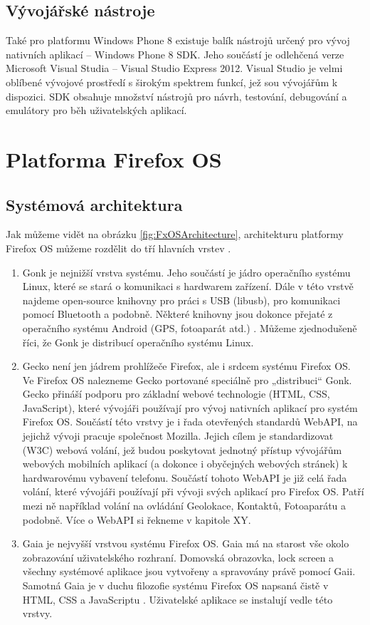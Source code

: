 \subsection{Vývojářské nástroje}
Také pro platformu Windows Phone 8 existuje balík nástrojů určený pro vývoj nativních aplikací – Windows Phone 8 SDK. Jeho součástí je odlehčená verze Microsoft Visual Studia – Visual Studio Express 2012. Visual Studio je velmi oblíbené vývojové prostředí s širokým spektrem funkcí, jež sou vývojářům k dispozici. SDK obsahuje množství nástrojů pro návrh, testování, debugování a emulátory pro běh uživatelských aplikací.

\section{Platforma Firefox OS} \label{Sec:FxOS}
\subsection{Systémová architektura}
Jak můžeme vidět na obrázku \ref{fig:FxOSArchitecture}, architekturu platformy Firefox OS můžeme rozdělit do tří hlavních vrstev \cite{fxOs_architecture}.

\begin{enumerate}
	\item Gonk je nejnižší vrstva systému. Jeho součástí je jádro operačního systému Linux, které se stará o komunikaci s hardwarem zařízení. Dále v této vrstvě najdeme open-source knihovny pro práci s USB (libusb), pro komunikaci pomocí Bluetooth a podobně. Některé knihovny jsou dokonce přejaté z operačního systému Android (GPS, fotoaparát atd.) \cite{fxOs_architecture}. Můžeme zjednodušeně říci, že Gonk je distribucí operačního systému Linux.
	\item Gecko není jen jádrem prohlížeče Firefox, ale i srdcem systému Firefox OS. Ve Firefox OS nalezneme Gecko portované speciálně pro „distribuci“ Gonk. Gecko přináší podporu pro základní webové technologie (HTML, CSS, JavaScript), které vývojáři používají pro vývoj nativních aplikací pro systém Firefox OS. Součástí této vrstvy je i řada otevřených standardů WebAPI, na jejichž vývoji pracuje společnost Mozilla. Jejich cílem je standardizovat (W3C) webová volání, jež budou poskytovat jednotný přístup vývojářům webových mobilních aplikací (a dokonce i obyčejných webových stránek) k hardwarovému vybavení telefonu. Součástí tohoto WebAPI je již celá řada volání, které vývojáři používají při vývoji svých aplikací pro Firefox OS. Patří mezi ně například volání na ovládání Geolokace, Kontaktů, Fotoaparátu a podobně. Více o WebAPI si řekneme v kapitole XY. %
	\item Gaia je nejvyšší vrstvou systému Firefox OS. Gaia má na starost vše okolo zobrazování uživatelského rozhraní. Domovská obrazovka, lock screen a všechny systémové aplikace jsou vytvořeny a spravovány právě pomocí Gaii. Samotná Gaia je v duchu filozofie systému Firefox OS napsaná čistě v HTML, CSS a JavaScriptu \cite{fxOs_architecture}. Uživatelské aplikace se instalují vedle této vrstvy.
\end{enumerate}

